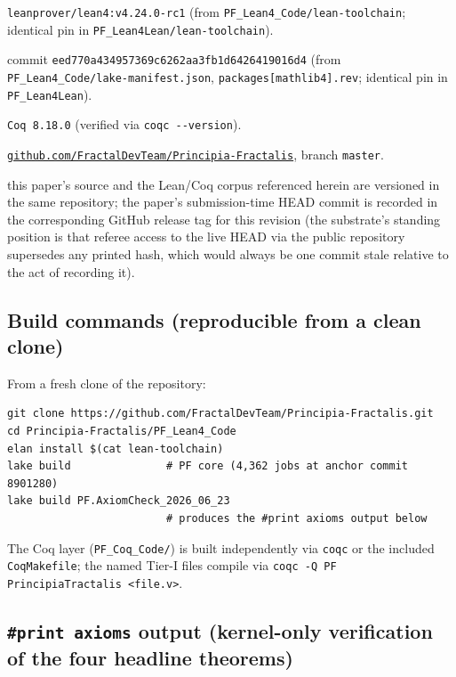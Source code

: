 \documentclass[11pt,a4paper]{amsart}
\theoremstyle{plain}
\theoremstyle{definition}
\begin{document}
\begin{description}[font=\normalfont\bfseries,leftmargin=2em,itemsep=2pt]
\item[Lean toolchain] \texttt{leanprover/lean4:v4.24.0-rc1} (from \texttt{PF\_Lean4\_Code/lean-toolchain}; identical pin in \texttt{PF\_Lean4Lean/lean-toolchain}).
\item[mathlib revision] commit \texttt{eed770a434957369c6262aa3fb1d6426419016d4} (from \texttt{PF\_Lean4\_Code/lake-manifest.json}, \texttt{packages[mathlib4].rev}; identical pin in \texttt{PF\_Lean4Lean}).
\item[Coq version] \texttt{Coq 8.18.0} (verified via \texttt{coqc -{}-version}).
\item[Repository] \href{https://github.com/FractalDevTeam/Principia-Fractalis}{\texttt{github.com/FractalDevTeam/Principia-Fractalis}}, branch \texttt{master}.
\item[Paper-revision HEAD at submission] this paper's source and the Lean/Coq corpus referenced herein are versioned in the same repository; the paper's submission-time HEAD commit is recorded in the corresponding GitHub release tag for this revision (the substrate's standing position is that referee access to the live HEAD via the public repository supersedes any printed hash, which would always be one commit stale relative to the act of recording it).
\end{description}

\subsection{Build commands (reproducible from a clean clone)}\label{subsec:repro-build}

From a fresh clone of the repository:

\begin{verbatim}
git clone https://github.com/FractalDevTeam/Principia-Fractalis.git
cd Principia-Fractalis/PF_Lean4_Code
elan install $(cat lean-toolchain)
lake build               # PF core (4,362 jobs at anchor commit 8901280)
lake build PF.AxiomCheck_2026_06_23
                         # produces the #print axioms output below
\end{verbatim}

The Coq layer (\texttt{PF\_Coq\_Code/}) is built independently via \texttt{coqc} or the included \texttt{CoqMakefile}; the named Tier-I files compile via \texttt{coqc -Q PF PrincipiaTractalis <file.v>}.

\subsection{\texttt{\#print axioms} output (kernel-only verification of the four headline theorems)}\label{subsec:repro-axioms}
\end{document}
